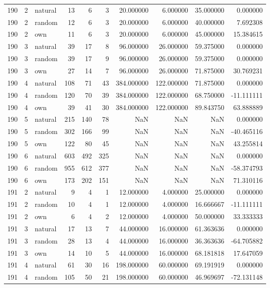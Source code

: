 \begin{table}[htbp]
\begin{tabular}{rrlrrrrrrr}
190 & 2 & natural & 13 & 6 & 3 & 20.000000 & 6.000000 & 35.000000 & 0.000000 \\
190 & 2 & random & 12 & 6 & 3 & 20.000000 & 6.000000 & 40.000000 & 7.692308 \\
190 & 2 & own & 11 & 6 & 3 & 20.000000 & 6.000000 & 45.000000 & 15.384615 \\
190 & 3 & natural & 39 & 17 & 8 & 96.000000 & 26.000000 & 59.375000 & 0.000000 \\
190 & 3 & random & 39 & 17 & 9 & 96.000000 & 26.000000 & 59.375000 & 0.000000 \\
190 & 3 & own & 27 & 14 & 7 & 96.000000 & 26.000000 & 71.875000 & 30.769231 \\
190 & 4 & natural & 108 & 71 & 43 & 384.000000 & 122.000000 & 71.875000 & 0.000000 \\
190 & 4 & random & 120 & 70 & 39 & 384.000000 & 122.000000 & 68.750000 & -11.111111 \\
190 & 4 & own & 39 & 41 & 30 & 384.000000 & 122.000000 & 89.843750 & 63.888889 \\
190 & 5 & natural & 215 & 140 & 78 & NaN & NaN & NaN & 0.000000 \\
190 & 5 & random & 302 & 166 & 99 & NaN & NaN & NaN & -40.465116 \\
190 & 5 & own & 122 & 80 & 45 & NaN & NaN & NaN & 43.255814 \\
190 & 6 & natural & 603 & 492 & 325 & NaN & NaN & NaN & 0.000000 \\
190 & 6 & random & 955 & 612 & 377 & NaN & NaN & NaN & -58.374793 \\
190 & 6 & own & 173 & 202 & 151 & NaN & NaN & NaN & 71.310116 \\
191 & 2 & natural & 9 & 4 & 1 & 12.000000 & 4.000000 & 25.000000 & 0.000000 \\
191 & 2 & random & 10 & 4 & 1 & 12.000000 & 4.000000 & 16.666667 & -11.111111 \\
191 & 2 & own & 6 & 4 & 2 & 12.000000 & 4.000000 & 50.000000 & 33.333333 \\
191 & 3 & natural & 17 & 13 & 7 & 44.000000 & 16.000000 & 61.363636 & 0.000000 \\
191 & 3 & random & 28 & 13 & 4 & 44.000000 & 16.000000 & 36.363636 & -64.705882 \\
191 & 3 & own & 14 & 10 & 5 & 44.000000 & 16.000000 & 68.181818 & 17.647059 \\
191 & 4 & natural & 61 & 30 & 16 & 198.000000 & 60.000000 & 69.191919 & 0.000000 \\
191 & 4 & random & 105 & 50 & 21 & 198.000000 & 60.000000 & 46.969697 & -72.131148 \\

\end{tabular}
\end{table}
